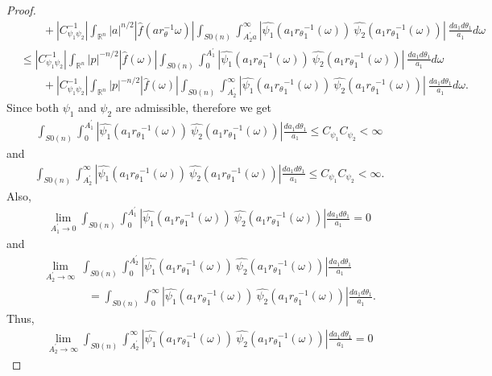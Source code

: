 \documentclass[11pt,reqno]{amsart}
\numberwithin{equation}{section}
\theoremstyle{definition}
\begin{document}
\begin{proof}
\begin{align*}
&\qquad+ |C_{\psi_1\psi_2}^{-1}|\int_{\mathbb{R}^n}|a|^{n/2}|\widehat{f}(ar_{\theta}^{-1}\omega)|\int_{S0(n)}\int_{A_2^{'}a}^{\infty} |\widehat{\psi_{1}}(a_1{r_\theta}_1^{-1}(\omega))\ \widehat{\psi_2}(a_1 {r_{\theta}}_1^{-1}(\omega))|\ \frac{da_1d\theta_1}{a_1}d\omega\\
&\leq |C_{\psi_1\psi_2}^{-1}|\int_{\mathbb{R}^n}|p|^{-n/2}|\widehat{f}(\omega)|\int_{S0(n)}\int_{0}^{A_1^{'}} |\widehat{\psi_{1}}(a_1 {r_{\theta}}_1^{-1}(\omega))\ \widehat{\psi_2}(a_1 {r_{\theta}}_1^{-1}(\omega))|\ \frac{da_1d\theta_1}{a_1}d\omega \\
&\qquad+ |C_{\psi_1\psi_2}^{-1}|\int_{\mathbb{R}^n}|p|^{-n/2}|\widehat{f}(\omega)|\int_{S0(n)}\int_{A_2^{'}}^{\infty} |\widehat{\psi_{1}}(a_1{r_\theta}_1^{-1}(\omega))\ \widehat{\psi_2}(a_1 {r_{\theta}}_1^{-1}(\omega))|\ \frac{da_1d\theta_1}{a_1}d\omega.  
\end{align*}
Since both $\psi_1$ and $\psi_2$ are admissible, therefore we get
\begin{align}\label{eq4}
\int_{S0(n)}\int_{0}^{A_1^{'}} |\widehat{\psi_{1}}(a_1{r_\theta}_1^{-1}(\omega))\ \widehat{\psi_2}(a_1{r_\theta}_1^{-1}(\omega))|\frac{da_1d\theta_1}{a_1}\leq C_{\psi_1}C_{\psi_2}< \infty
\end{align}
 and
\begin{align}\label{eq2}
\int_{S0(n)}\int_{A_2^{'}}^{\infty} |\widehat{\psi_{1}}(a_1{r_\theta}_1^{-1}(\omega))\ \widehat{\psi_2}(a_1{r_\theta}_1^{-1}(\omega))|\frac{da_1d\theta_1}{a_1}\leq C_{\psi_1}C_{\psi_2}< \infty.
\end{align}
Also,
\begin{align*}
\lim\limits_{A_1^{'}\to 0}\int_{S0(n)}\int_{0}^{A_1^{'}}|\widehat{\psi_{1}}(a_1{r_\theta}_1^{-1}(\omega))\ \widehat{\psi_2}(a_1{r_\theta}_1^{-1}(\omega))|\frac{da_1d\theta_1}{a_1}  =0
\end{align*}
and
\begin{align*}
&\lim\limits_{A_2^{'}\to \infty}\  \int_{S0(n)}\int_{0}^{A_2^{'}} |\widehat{\psi_{1}}(a_1{r_\theta}_1^{-1}(\omega))\ \widehat{\psi_2}(a_1{r_\theta}_1^{-1}(\omega))|\frac{da_1d\theta_1}{a_1} & \\
 &\qquad \qquad =\int_{S0(n)}\int_{0}^{\infty} |\widehat{\psi_{1}}(a_1{r_\theta}_1^{-1}(\omega))\ \widehat{\psi_2}(a_1{r_\theta}_1^{-1}(\omega))|\frac{da_1d\theta_1}{a_1}.
\end{align*}
Thus,
\begin{align*}
\lim\limits_{A_2^{'}\to \infty} \int_{S0(n)}\int_{A_2^{'}}^{\infty}|\widehat{\psi_{1}}(a_1{r_\theta}_1^{-1}(\omega))\ \widehat{\psi_2}(a_1{r_\theta}_1^{-1}(\omega))|\frac{da_1d\theta_1}{a_1}= 0

\end{align*}
\end{proof}
\end{document}
